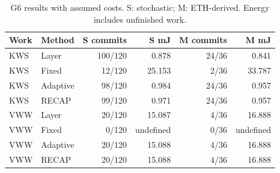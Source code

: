 \begin{table}[t]\caption{G6 results with assumed costs. S: stochastic; M: ETH-derived. Energy includes unfinished work.}\label{tab:main}
\centering\footnotesize\setlength{\tabcolsep}{2.5pt}
\begin{tabular}{llrrrr}\hline
Work & Method & S commits & S mJ & M commits & M mJ\\\hline
KWS & Layer & 100/120 & 0.878 & 24/36 & 0.841 \\
KWS & Fixed & 12/120 & 25.153 & 2/36 & 33.787 \\
KWS & Adaptive & 98/120 & 0.984 & 24/36 & 0.957 \\
KWS & RECAP & 99/120 & 0.971 & 24/36 & 0.957 \\
\hline
VWW & Layer & 20/120 & 15.087 & 4/36 & 16.888 \\
VWW & Fixed & 0/120 & undefined & 0/36 & undefined \\
VWW & Adaptive & 20/120 & 15.088 & 4/36 & 16.888 \\
VWW & RECAP & 20/120 & 15.088 & 4/36 & 16.888 \\
\hline
\end{tabular}\end{table}
